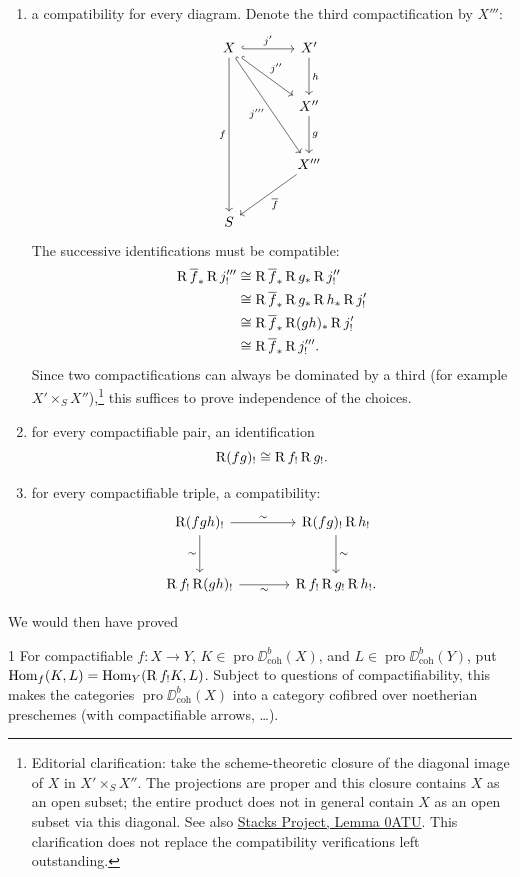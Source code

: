 \begin{enumerate}
\item[(a)] a compatibility for every diagram. Denote the third compactification by $X'''$:
\[
\begin{tikzcd}[row sep=large,column sep=large]
X \ar[r,hook,"j'"] \ar[dr,hook,"j''"] \ar[ddr,hook,"j'''"'] \ar[ddd,"f"']
 & X' \ar[d,"h"] \\
 & X'' \ar[d,"g"] \\
 & X''' \ar[dl,"\overline f"] \\
S
\end{tikzcd}
\]
The successive identifications must be compatible:
\[
\begin{aligned}
\operatorname{R}\overline f_*\operatorname{R} j'''_!
&\cong\operatorname{R}\overline f_*\operatorname{R} g_*\operatorname{R} j''_!\\
&\cong\operatorname{R}\overline f_*\operatorname{R} g_*\operatorname{R} h_*\operatorname{R} j'_!\\
&\cong\operatorname{R}\overline f_*\operatorname{R}(gh)_*\operatorname{R} j'_!\\
&\cong\operatorname{R}\overline f_*\operatorname{R} j'''_!.
\end{aligned}
\]
Since two compactifications can always be dominated by a
third (for example $X'\times_S X''$),\footnote{Editorial clarification: take the scheme-theoretic closure of the diagonal image of $X$ in $X'\times_S X''$. The projections are proper and this closure contains $X$ as an open subset; the entire product does not in general contain $X$ as an open subset via this diagonal. See also \href{https://stacks.math.columbia.edu/tag/0ATU}{Stacks Project, Lemma 0ATU}. This clarification does not replace the compatibility verifications left outstanding.} this suffices to prove
independence of the choices.
\item[(b)] for every compactifiable pair, an identification
\[
\operatorname{R}(fg)_!\cong\operatorname{R} f_!\operatorname{R} g_!.
\]
\item[(c)] for every compactifiable triple, a compatibility:
\[
\begin{tikzcd}[row sep=large,column sep=large]
\RR(fgh)_! \ar[r,"\sim"] \ar[d,"\sim"']
 & \RR(fg)_!\RR h_! \ar[d,"\sim"] \\
\RR f_!\RR(gh)_! \ar[r,"\sim"']
 & \RR f_!\RR g_!\RR h_!.
\end{tikzcd}
\]
\end{enumerate}

We would then have proved

\begin{booktheorem}{1}\label{appen:thm1}
For compactifiable $f:X\longrightarrow Y$, $K\in\operatorname{pro}\DD_{\operatorname{coh}}^b(X)$, and $L\in\operatorname{pro}\DD_{\operatorname{coh}}^b(Y)$, put $\operatorname{Hom}_f(K,L)=\operatorname{Hom}_Y(\operatorname{R} f_!K,L)$. Subject to questions of compactifiability, this makes the categories $\operatorname{pro}\DD_{\operatorname{coh}}^b(X)$ into a category cofibred over noetherian preschemes (with compactifiable arrows, \dots).
\end{booktheorem}

